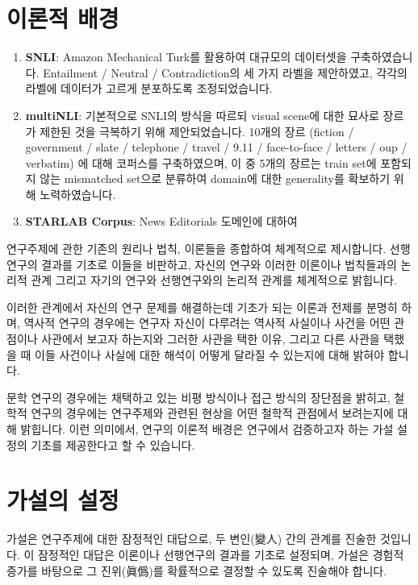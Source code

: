 \documentclass{article}
\begin{document}
\section{이론적 배경}
\begin{enumerate}
  \item \textbf{SNLI}: 
    Amazon Mechanical Turk를 활용하여 대규모의 데이터셋을 구축하였습니다.
    Entailment / Neutral / Contradiction의 세 가지 라벨을 제안하였고,
    각각의 라벨에 데이터가 고르게 분포하도록 조정되었습니다.
  \item \textbf{multiNLI}:
    기본적으로 SNLI의 방식을 따르되 visual scene에 대한 묘사로 장르가 제한된 것을
    극복하기 위해 제안되었습니다. 10개의 장르
    (fiction / government / slate / telephone / travel / 9.11 / face-to-face / letters / oup / verbatim)
    에 대해 코퍼스를 구축하였으며, 이 중 5개의 장르는 train set에 포함되지 않는 mismatched set으로 분류하여
    domain에 대한 generality를 확보하기 위해 노력하였습니다.
  \item \textbf{STARLAB Corpus}:
    News Editorials 도메인에 대하여 
\end{enumerate}

연구주제에 관한 기존의 원리나 법칙,
이론들을 종합하여 체계적으로 제시합니다.
선행연구의 결과를 기초로 이들을 비판하고, 자신의 연구와
이러한 이론이나 법칙들과의 논리적 관계 그리고 자기의 연구와
선행연구와의 논리적 관계를 체계적으로 밝힙니다.

이러한 관계에서 자신의 연구 문제를 해결하는데 기초가 되는
이론과 전제를 분명히 하며, 역사적 연구의 경우에는
연구자 자신이 다루려는 역사적 사실이나 사건을 어떤 관점이나
사관에서 보고자 하는지와 그러한 사관을 택한 이유,
그리고 다른 사관을 택했을 때 이들 사건이나 사실에 대한
해석이 어떻게 달라질 수 있는지에 대해 밝혀야 합니다.

문학 연구의 경우에는 채택하고 있는 비평 방식이나
접근 방식의 장단점을 밝히고, 철학적 연구의 경우에는
연구주제와 관련된 현상을 어떤 철학적 관점에서 보려는지에
대해 밝힙니다. 이런 의미에서, 연구의 이론적 배경은 연구에서
검증하고자 하는 가설 설정의 기초를 제공한다고 할 수 있습니다.

\section{가설의 설정} 
가설은 연구주제에 대한 잠정적인 대답으로,
두 변인(變人) 간의 관계를 진술한 것입니다. 
이 잠정적인 대답은 이론이나 선행연구의 결과를 기초로 설정되며,
가설은 경험적 증가를 바탕으로 그 진위(眞僞)를 확률적으로
결정할 수 있도록 진술해야 합니다.
\end{document}
